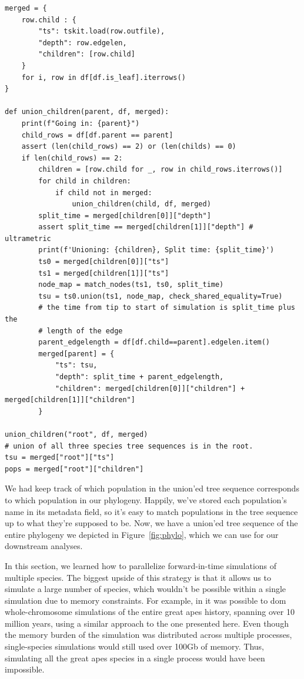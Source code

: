\documentclass[12pt]{article}
\begin{document}
\begin{verbatim}
merged = {
    row.child : {
        "ts": tskit.load(row.outfile),
        "depth": row.edgelen,
        "children": [row.child]
    }
    for i, row in df[df.is_leaf].iterrows()
}

def union_children(parent, df, merged):
    print(f"Going in: {parent}")
    child_rows = df[df.parent == parent]
    assert (len(child_rows) == 2) or (len(childs) == 0)
    if len(child_rows) == 2:
        children = [row.child for _, row in child_rows.iterrows()]
        for child in children:
            if child not in merged:
                union_children(child, df, merged)
        split_time = merged[children[0]]["depth"]
        assert split_time == merged[children[1]]["depth"] # ultrametric
        print(f'Unioning: {children}, Split time: {split_time}')
        ts0 = merged[children[0]]["ts"]
        ts1 = merged[children[1]]["ts"]
        node_map = match_nodes(ts1, ts0, split_time)
        tsu = ts0.union(ts1, node_map, check_shared_equality=True)
        # the time from tip to start of simulation is split_time plus the
        # length of the edge
        parent_edgelength = df[df.child==parent].edgelen.item()
        merged[parent] = {
            "ts": tsu,
            "depth": split_time + parent_edgelength,
            "children": merged[children[0]]["children"] + merged[children[1]]["children"]
        }

union_children("root", df, merged)
# union of all three species tree sequences is in the root.
tsu = merged["root"]["ts"]
pops = merged["root"]["children"]
\end{verbatim}

We had keep track of which population in the union’ed tree sequence corresponds to which population in our phylogeny.
Happily, we’ve stored each population’s name in its metadata field, 
so it’s easy to match populations in the tree sequence up to what they’re supposed to be.
Now, we have a union'ed tree sequence of the entire phylogeny we depicted in Figure~\ref{fig:phylo},
which we can use for our downstream analyses.

In this section, we learned how to parallelize forward-in-time simulations of multiple species.
The biggest upside of this strategy is that it allows us to simulate a large number of species,
which wouldn't be possible within a single simulation due to memory constraints.
For example, in \citet{rodrigues2024shared} it was possible to dom whole-chromosome simulations of the entire great apes history,
spanning over 10 million years, using a similar approach to the one presented here.
Even though the memory burden of the simulation was distributed across multiple processes,
single-species simulations would still used over 100Gb of memory.
Thus, simulating all the great apes species in a single process would have been impossible.
\end{document}
